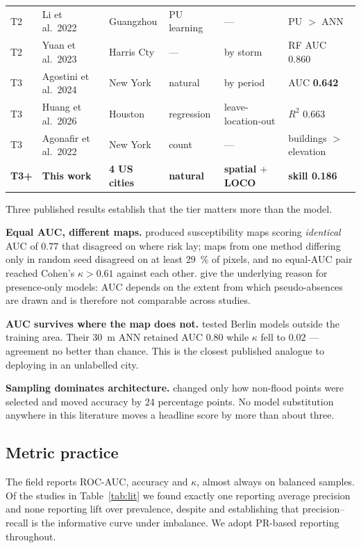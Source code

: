 \documentclass[11pt]{article}
\newcommand{\best}[1]{\textbf{#1}}
\begin{document}
\begin{table}[t]
\begin{tabular}{@{}llllll@{}}
T2 & Li et al.\ 2022 & Guangzhou & PU learning & --- & PU $>$ ANN \\
T2 & Yuan et al.\ 2023 & Harris Cty & --- & by storm & RF AUC 0.860 \\
\midrule
T3 & Agostini et al.\ 2024 & New York & natural & by period & AUC \best{0.642} \\
T3 & Huang et al.\ 2026 & Houston & regression & leave-location-out & $R^2$ 0.663 \\
T3 & Agonafir et al.\ 2022 & New York & count & --- & buildings $>$ elevation \\
\midrule
\textbf{T3+} & \textbf{This work} & \textbf{4 US cities} & \textbf{natural} &
  \textbf{spatial $+$ LOCO} & \textbf{skill 0.186} \\
\bottomrule
\end{tabular}
\end{table}

Three published results establish that the tier matters more than the model.

\textbf{Equal AUC, different maps.} \citet{vakhshoori2018} produced
susceptibility maps scoring \emph{identical} AUC of $0.77$ that disagreed on
where risk lay; maps from one method differing only in random seed disagreed on
at least \SI{29}{\percent} of pixels, and no equal-AUC pair reached
Cohen's $\kappa > 0.61$ against each other. \citet{lobo2008} give the underlying
reason for presence-only models: AUC depends on the extent from which
pseudo-absences are drawn and is therefore not comparable across studies.

\textbf{AUC survives where the map does not.} \citet{seleem2022} tested Berlin
models outside the training area. Their \SI{30}{\metre} ANN retained
AUC $0.80$ while $\kappa$ fell to $0.02$ --- agreement no better than chance.
This is the closest published analogue to deploying in an unlabelled city.

\textbf{Sampling dominates architecture.} \citet{zhang2025} changed only how
non-flood points were selected and moved accuracy by \num{24} percentage points.
No model substitution anywhere in this literature moves a headline score by more
than about three.

\subsection{Metric practice}
The field reports ROC-AUC, accuracy and $\kappa$, almost always on balanced
samples. Of the studies in Table~\ref{tab:lit} we found exactly one reporting
average precision and none reporting lift over prevalence, despite
\citet{saito2015} and \citet{davis2006} establishing that precision--recall is
the informative curve under imbalance. We adopt PR-based reporting throughout.
\end{document}
